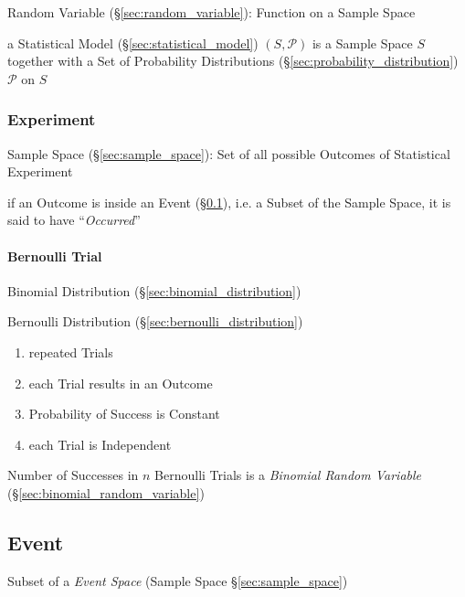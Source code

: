 Random Variable (\S\ref{sec:random_variable}): Function on a Sample
Space

a Statistical Model (\S\ref{sec:statistical_model}) $(S,\mathcal{P})$ is a
Sample Space $S$ together with a Set of Probability Distributions
(\S\ref{sec:probability_distribution}) $\mathcal{P}$ on $S$



\subsubsection{Experiment}\label{sec:experiment}

Sample Space (\S\ref{sec:sample_space}): Set of all possible Outcomes of
Statistical Experiment

if an Outcome is inside an Event (\S\ref{sec:probability_event}), i.e. a Subset
of the Sample Space, it is said to have ``\emph{Occurred}''



\paragraph{Bernoulli Trial}\label{sec:bernoulli_trial}\hfill

Binomial Distribution (\S\ref{sec:binomial_distribution})

Bernoulli Distribution (\S\ref{sec:bernoulli_distribution})

\begin{enumerate}
  \item repeated Trials
  \item each Trial results in an Outcome
  \item Probability of Success is Constant
  \item each Trial is Independent
\end{enumerate}

Number of Successes in $n$ Bernoulli Trials is a \emph{Binomial Random
  Variable} (\S\ref{sec:binomial_random_variable})



\subsection{Event}\label{sec:probability_event}

Subset of a \emph{Event Space} (Sample Space \S\ref{sec:sample_space})

